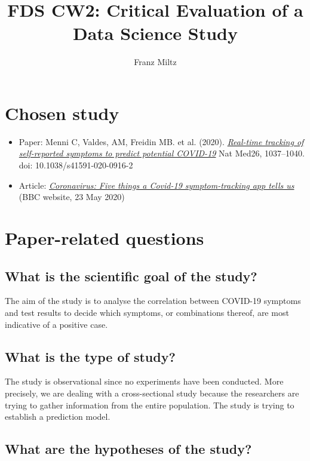 \documentclass{article}
\title{FDS CW2: Critical Evaluation of a Data Science Study}
\author{Franz Miltz}
\begin{document}
\maketitle

\section*{Chosen study}

\begin{itemize}
    \item Paper: Menni C, Valdes, AM, Freidin MB. et al. (2020). 
            \emph{\href{https://www.nature.com/articles/s41591-020-0916-2?fbclid=IwAR0tkHR2rBZ9vPGhoc8pm7ZreHZ0HdkVOzLGU2mxvYhgZ2n9DkWDZLRfys4}
            {Real-time tracking of self-reported symptoms to predict potential COVID-19}} Nat Med26, 1037–1040. doi: 10.1038/s41591-020-0916-2
    \item Article: \emph{\href{https://www.bbc.co.uk/news/health-52770313}{Coronavirus: Five things a Covid-19 symptom-tracking app tells us}} (BBC website, 23 May 2020)
\end{itemize}


\section{Paper-related questions}


\subsection{What is the scientific goal of the study?}

The aim of the study is to analyse the correlation between COVID-19 symptoms and test results
to decide which symptoms, or combinations thereof, are most indicative of a positive case.

\subsection{What is the type of study?}

The study is observational since no experiments have been conducted. More precisely, we are
dealing with a cross-sectional study because the researchers are trying to gather information
from the entire population. The study is trying to establish a prediction model.

\subsection{What are the hypotheses of the study?}
\end{document}
